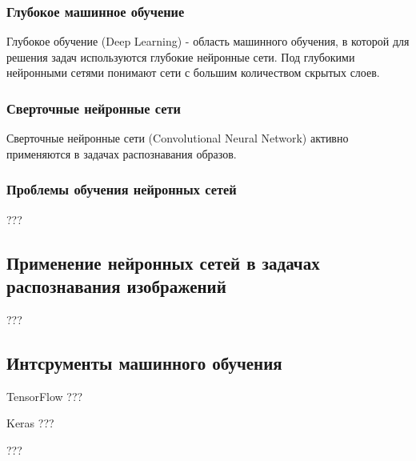 \subsubsection{Глубокое машинное обучение}
Глубокое обучение (Deep Learning) - область машинного обучения, в которой для решения задач используются глубокие нейронные сети. Под глубокими нейронными сетями понимают сети с большим количеством скрытых слоев. 
\subsubsection{Сверточные нейронные сети}
Сверточные нейронные сети (Convolutional Neural Network) активно применяются в задачах распознавания образов. 
\subsubsection{Проблемы обучения нейронных сетей}
???
\subsection{Применение нейронных сетей в задачах распознавания изображений}
???
\subsection{Интсрументы машинного обучения}
TensorFlow ???

Keras ???

???
\clearpage